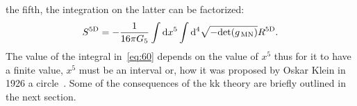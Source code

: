 the fifth, the integration on the latter can be factorized:
\begin{equation}
  \label{eq:60}
  S^{5 \mathrm{D}} = - \frac{1}{16 \pi G_5} \int \mathrm{d} x^5 \int \mathrm{d}^4 \sqrt{-
    \mathrm{det}(g_{\mathrm{\, MN}})} R^{5 \mathrm{D}}.
\end{equation}
The value of the integral in~\cref{eq:60} depends on the value of $x^5$ thus for
it to have a finite value, $x^5$ must be an interval or, how it was proposed by
Oskar Klein in 1926 a circle~\cite{Klein}. Some of the consequences of the
\gls{kk} theory are briefly outlined in the next section.
